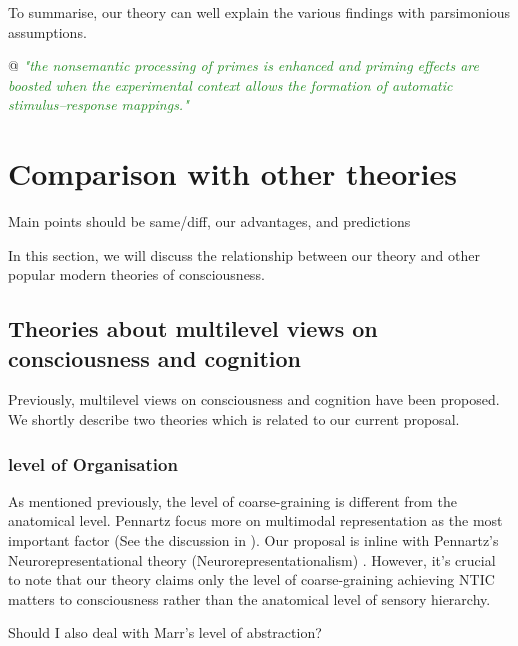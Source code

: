 \documentclass[utf8]{article}
\newenvironment{ants}
			{
			 \begin{easylist}[itemize]
		 	}
			{
			\end{easylist}
			} %
\newcommand{\rewrite}[1]{\textcolor{ForestGreen}{\textit{"#1"}}\newline}
\newcommand{\ideaBox}[1]{
			    \vspace{2mm}
				\begin{tcolorbox}[enhanced,%
                    title=-,
                    center,
                    fontupper=\small,
                    lifted shadow={1mm}{-2mm}{3mm}{0.1mm}{black!50!white},%
                    boxrule=0.4pt,
                    width=9cm,
                    colback=Thistle!50!white,
                    sharp corners]
					#1
				\end{tcolorbox}
				\vspace{2mm}
			}
\newcommand{\rlstart}[1]{  %
        \setlength\changebarwidth{#1pt*2}  %
        \hspace*{-40pt}
        \cbstart{\textcolor{red}{\newline\textbf{iteration #1}}\newline}}
\newcommand{\rlend}{\cbend}
\begin{document}
		To summarise, our theory can well explain the various findings with parsimonious assumptions. 
		
		
	    \begin{ants}
	        @ \rewrite{the nonsemantic processing of primes is enhanced and priming effects are boosted when the experimental context allows the formation of automatic stimulus–response mappings.}\cite{VandenBussche2009}
	    \end{ants}
		
        

\rlend


	\section{Comparison with other theories}
		\ideaBox{Main points should be same/diff, our advantages, and predictions}
		In this section, we will discuss the relationship between our theory and other popular modern theories of consciousness. 

\rlstart{2}
		\subsection{Theories about multilevel views on consciousness and cognition}
        Previously, multilevel views on consciousness and cognition have been proposed. We shortly describe two theories which is  related to our current proposal.	%
        
            \subsubsection{level of Organisation \cite{wimsatt1994ontology}}
                As mentioned previously, the level of coarse-graining is different from the anatomical level.
                Pennartz focus more on multimodal representation as the most important factor (See the discussion in \cite{pennartz2015brain}). Our proposal is inline with Pennartz's Neurorepresentational  theory (Neurorepresentationalism) \cite{pennartz2018consciousness,pennartz2015brain}. However, it’s crucial to note that our theory claims only the level of coarse-graining achieving NTIC matters to consciousness rather than the anatomical level of sensory hierarchy. 
                \ideaBox{Should I also deal with Marr's level of abstraction?}
                
                
			
\end{document}
